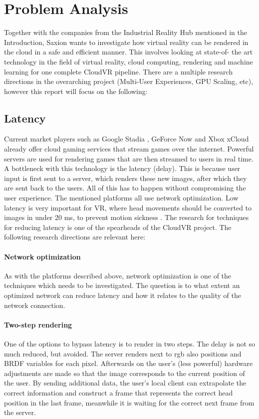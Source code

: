 \section{Problem Analysis}

Together with the companies from the Industrial Reality Hub mentioned in the Introduction, Saxion wants to investigate how virtual reality
can be rendered in the cloud in a safe and efficient manner. This involves looking at state-of-
the art technology in the field of virtual reality, cloud computing, rendering and machine learning for one
complete CloudVR pipeline. There are a multiple research directions in the overarching project (Multi-User Experiences, GPU Scaling, etc), however this report will focus on the following:

\subsection{Latency}
Current market players such as Google Stadia \parencite{stadia}, GeForce Now \parencite{geforcenow} and Xbox xCloud \parencite{xcloud} already offer cloud gaming services that stream games over the internet. Powerful servers are used for rendering games that are then streamed to users in real time. A bottleneck with this technology is the latency (delay). This is because user input is first sent to a server, which renders these new images, after which they are sent back to the users. All of this has to happen without compromising the user experience. The mentioned platforms all use network optimization. Low latency is very important for VR, where head movements should be converted to images in under 20 \acrfull{ms}, to prevent motion sickness \parencite{valvevrlatency}. The research for techniques for reducing latency is one of the spearheads of the CloudVR project. The following research directions are relevant here:

\paragraph{Network optimization}
As with the platforms described above, network optimization is one of the techniques
which needs to be investigated. The question is to what extent an optimized network
can reduce latency and how it relates to the quality of the network connection.
\paragraph{Two-step rendering}
One of the options to bypass latency is to render in two steps.
The delay is not so much reduced, but avoided. The server renders next to
\acrshort{rgb} also positions and BRDF variables for each pixel. Afterwards on the
user's (less powerful) hardware adjustments are made so that the image corresponds to the current position of the user.
By sending additional data, the user's local client can extrapolate the correct information and construct a frame that represents the correct head position in the last frame, meanwhile it is waiting for the  correct next frame from the server.
